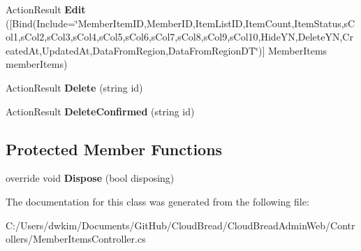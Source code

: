 \begin{DoxyCompactItemize}
\item 
Action\+Result {\bfseries Edit} (\mbox{[}Bind(Include=\char`\"{}Member\+Item\+ID,Member\+ID,Item\+List\+ID,Item\+Count,Item\+Status,s\+Col1,s\+Col2,s\+Col3,s\+Col4,s\+Col5,s\+Col6,s\+Col7,s\+Col8,s\+Col9,s\+Col10,Hide\+YN,Delete\+YN,Created\+At,Updated\+At,Data\+From\+Region,Data\+From\+Region\+DT\char`\"{})\mbox{]} Member\+Items member\+Items)\hypertarget{a00144_ad3896218307a40e31b593458ab502efc}{}\label{a00144_ad3896218307a40e31b593458ab502efc}

\item 
Action\+Result {\bfseries Delete} (string id)\hypertarget{a00144_ab85321dfeeabb077a878d7ef5f158ffb}{}\label{a00144_ab85321dfeeabb077a878d7ef5f158ffb}

\item 
Action\+Result {\bfseries Delete\+Confirmed} (string id)\hypertarget{a00144_ae4f8a8d227c0f5b812503387c356951c}{}\label{a00144_ae4f8a8d227c0f5b812503387c356951c}

\end{DoxyCompactItemize}
\subsection*{Protected Member Functions}
\begin{DoxyCompactItemize}
\item 
override void {\bfseries Dispose} (bool disposing)\hypertarget{a00144_ad8e76166b24fdf2e37d0ceeb4134d2e7}{}\label{a00144_ad8e76166b24fdf2e37d0ceeb4134d2e7}

\end{DoxyCompactItemize}


The documentation for this class was generated from the following file\+:\begin{DoxyCompactItemize}
\item 
C\+:/\+Users/dwkim/\+Documents/\+Git\+Hub/\+Cloud\+Bread/\+Cloud\+Bread\+Admin\+Web/\+Controllers/Member\+Items\+Controller.\+cs\end{DoxyCompactItemize}
